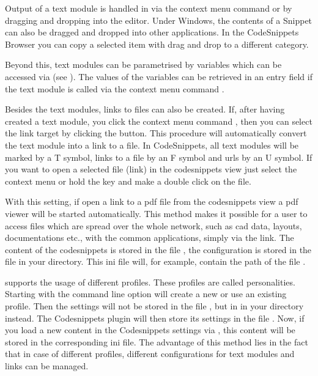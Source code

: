 
Output of a text module is handled in \codeblocks via the context menu command  or by dragging and dropping into the editor. Under Windows, the contents of a Snippet can also be dragged and dropped into other applications. In the CodeSnippets Browser you can copy a selected item with drag and drop to a different category.

Beyond this, text modules can be parametrised by  variables which can be accessed via  (see ). The values of the variables can be retrieved in an entry field if the text module is called via the context menu command .

Besides the text modules, links to files can also be created. If, after having created a text module, you click the context menu command , then you can select the link target by clicking the  button. This procedure will automatically convert the text module into a link to a file. In CodeSnippets, all text modules will be marked by a T symbol, links to a file by an F symbol and urls by an U symbol. If you want to open a selected file (link) in the codesnippets view just select the context menu  or hold the  key and make a double click on the file.


With this setting, if open a link to a pdf file from the codesnippets view a pdf viewer will be started automatically. This method makes it possible for a user to access files which are spread over the whole network, such as cad data, layouts, documentations etc., with the common applications, simply via the link. The content of the codesnippets is stored in the file , the configuration is stored in the file  in your  directory. This ini file will, for example, contain the path of the file .

\codeblocks supports the usage of different profiles. These profiles are called personalities. Starting \codeblocks with the command line option  will create a new or use an existing profile. Then the settings will not be stored in the file , but in  in your  directory instead. The Codesnippets plugin will then store its settings in the file . Now, if you load a new content  in the Codesnippets settings via , this content will be stored in the corresponding ini file. The advantage of this method lies in the fact that in case of different profiles, different configurations for text modules and links can be managed.

